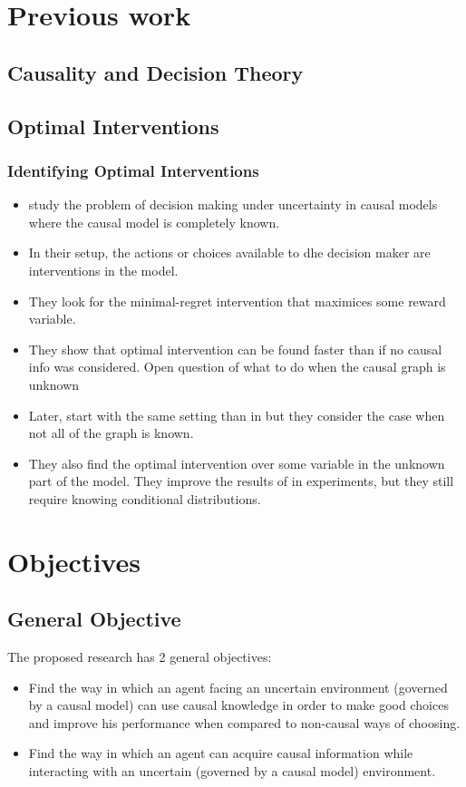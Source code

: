 \documentclass{beamer}
\theoremstyle{plain}
\begin{document}
\section{Previous work}
	\subsection{Causality and Decision Theory}
	\subsection{Optimal Interventions}
	\begin{frame}[allowframebreaks]
	\frametitle{Identifying Optimal Interventions}
	\begin{itemize}
		\item \cite{lattimoreNIPS2016} study the problem of decision making under uncertainty in causal models where the causal model is completely known.
		\item In their setup, the actions or choices available to dhe decision maker are interventions in the model.
		\item They look for the minimal-regret intervention that maximices some reward variable. 
		\item They show that optimal intervention can be found faster than if no causal info was considered. Open question of what to do when the causal graph is unknown
		\item Later, \cite{sen2017identifying} start with the same setting than in \cite{lattimoreNIPS2016} but they consider the case when not all of the graph is known. 
		\item They also find the optimal intervention over some variable in the unknown part of the model. They improve the results of \cite{lattimoreNIPS2016} in experiments, but they still require knowing conditional distributions.
	\end{itemize}
\end{frame}
\section{Objectives}
	\subsection{General Objective}
	\begin{frame}
	The proposed research has 2 general objectives: 
	\begin{itemize}
	\item Find the way in which an agent facing an uncertain environment (governed by a causal model) can use causal knowledge in order to make good choices and improve his performance when compared to non-causal ways of choosing.
	\item Find the way in which an agent can acquire causal information while interacting with an uncertain (governed by a causal model) environment.
	\end{itemize}
	\end{frame}
\end{document}
